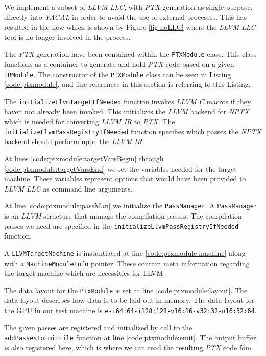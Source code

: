We implement a subset of \textit{LLVM LLC}, with \textit{PTX} generation as single purpose, directly into \textit{YAGAL} in order to avoid the use of external processes. This has resulted in the flow which is shown by Figure \ref{fig:noLLC} where the \textit{LLVM LLC} tool is no longer involved in the process.

The \textit{PTX} generation have been contained within the \texttt{PTXModule} class. This class functions as a container to generate and hold \textit{PTX} code based on a given \texttt{IRModule}. The constructor of the \texttt{PTXModule} class can be seen in Listing \ref{code:ptxmodule}, and line references in this section is referring to this Listing. 

The \texttt{initializeLlvmTargetIfNeeded} function invokes \textit{LLVM C} macros if they haven not already been invoked. This initializes the \textit{LLVM} backend for \textit{NPTX} which is needed for converting \textit{LLVM IR} to \textit{PTX}. The \texttt{initializeLlvmPassRegistryIfNeeded} function specifies which passes the \textit{NPTX} backend should perform upon the \textit{LLVM IR}.

At lines \ref{code:ptxmodule:targetVarsBegin} through \ref{code:ptxmodule:targetVarsEnd} we set the variables needed for the target machine. These variables represent options that would have been provided to \textit{LLVM LLC} as command line arguments.

At line \ref{code:ptxmodule:passMan} we initialize the \texttt{PassManager}. A \texttt{PassManager} is an \textit{LLVM} structure that manage the compilation passes. The compilation passes we need are specified in the \texttt{initializeLlvmPassRegistryIfNeeded} function.


A \texttt{LLVMTargetMachine} is instantiated at line \ref{code:ptxmodule:machine} along with a \texttt{MachineModuleInfo} pointer. These contain meta information regarding the target machine which are necessities for LLVM.

The data layout for the \texttt{PtxModule} is set at line \ref{code:ptxmodule:layout}. The data layout describes how data is to be laid out in memory. The data layout for the GPU in our test machine is \texttt{e-i64:64-i128:128-v16:16-v32:32-n16:32:64}.

The given passes are registered and initialized by call to the \texttt{addPassesToEmitFile} function at line \ref{code:ptxmodule:emit}. The output buffer is also registered here, which is where we can read the resulting \textit{PTX} code fom.

